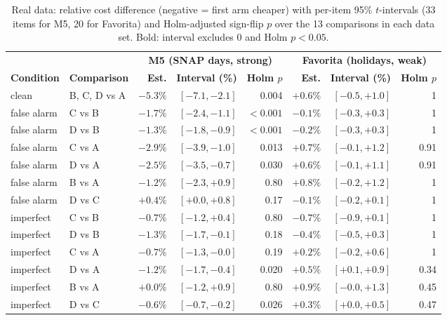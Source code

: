 \begin{table}[t]
\centering
\caption{Real data: relative cost difference (negative = first arm cheaper) with per-item 95\% $t$-intervals (33 items for M5, 20 for Favorita) and Holm-adjusted sign-flip $p$ over the 13 comparisons in each data set. Bold: interval excludes 0 and Holm $p < 0.05$.}
\label{tab:realci}
\setlength{\tabcolsep}{5pt}
\footnotesize
\begin{tabular}{@{}ll rrr @{\hspace{14pt}} rrr@{}}
\toprule
 & & \multicolumn{3}{c}{\textbf{M5 (SNAP days, strong)}} & \multicolumn{3}{c}{\textbf{Favorita (holidays, weak)}} \\
\cmidrule(lr){3-5}\cmidrule(l){6-8}
\textbf{Condition} & \textbf{Comparison} & \textbf{Est.} & \textbf{Interval (\%)} & \textbf{Holm $p$} & \textbf{Est.} & \textbf{Interval (\%)} & \textbf{Holm $p$} \\
\midrule
clean       & B, C, D vs A & $\mathbf{-5.3\%}$ & $[-7.1, -2.1]$ & 0.004 & $+0.6\%$ & $[-0.5, +1.0]$ & 1 \\
false alarm & C vs B & $\mathbf{-1.7\%}$ & $[-2.4, -1.1]$ & $<0.001$ & $-0.1\%$ & $[-0.3, +0.3]$ & 1 \\
false alarm & D vs B & $\mathbf{-1.3\%}$ & $[-1.8, -0.9]$ & $<0.001$ & $-0.2\%$ & $[-0.3, +0.3]$ & 1 \\
false alarm & C vs A & $\mathbf{-2.9\%}$ & $[-3.9, -1.0]$ & 0.013 & $+0.7\%$ & $[-0.1, +1.2]$ & 0.91 \\
false alarm & D vs A & $\mathbf{-2.5\%}$ & $[-3.5, -0.7]$ & 0.030 & $+0.6\%$ & $[-0.1, +1.1]$ & 0.91 \\
false alarm & B vs A & $-1.2\%$ & $[-2.3, +0.9]$ & 0.80 & $+0.8\%$ & $[-0.2, +1.2]$ & 1 \\
false alarm & D vs C & $+0.4\%$ & $[+0.0, +0.8]$ & 0.17 & $-0.1\%$ & $[-0.2, +0.1]$ & 1 \\
imperfect   & C vs B & $-0.7\%$ & $[-1.2, +0.4]$ & 0.80 & $-0.7\%$ & $[-0.9, +0.1]$ & 1 \\
imperfect   & D vs B & $-1.3\%$ & $[-1.7, -0.1]$ & 0.18 & $-0.4\%$ & $[-0.5, +0.3]$ & 1 \\
imperfect   & C vs A & $-0.7\%$ & $[-1.3, -0.0]$ & 0.19 & $+0.2\%$ & $[-0.2, +0.6]$ & 1 \\
imperfect   & D vs A & $\mathbf{-1.2\%}$ & $[-1.7, -0.4]$ & 0.020 & $+0.5\%$ & $[+0.1, +0.9]$ & 0.34 \\
imperfect   & B vs A & $+0.0\%$ & $[-1.2, +0.9]$ & 0.80 & $+0.9\%$ & $[-0.0, +1.3]$ & 0.45 \\
imperfect   & D vs C & $\mathbf{-0.6\%}$ & $[-0.7, -0.2]$ & 0.026 & $+0.3\%$ & $[+0.0, +0.5]$ & 0.47 \\
\bottomrule
\end{tabular}
\end{table}

